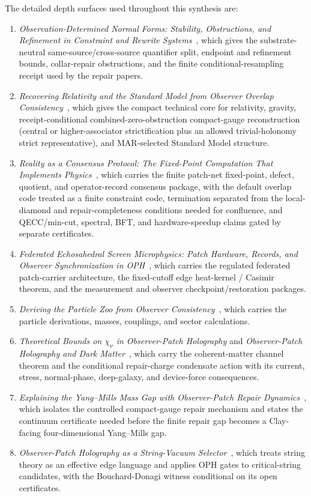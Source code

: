\documentclass[11pt]{article}
\begin{document}
The detailed depth surfaces used throughout this synthesis are:
\begin{enumerate}[leftmargin=2em]
\item \emph{Observation-Determined Normal Forms: Stability, Obstructions, and Refinement in Constraint and Rewrite Systems}~\cite{observableNormalForms}, which gives the substrate-neutral same-source/cross-source quantifier split, endpoint and refinement bounds, collar-repair obstructions, and the finite conditional-resampling receipt used by the repair papers.
\item \emph{Recovering Relativity and the Standard Model from Observer Overlap Consistency}~\cite{ophcompact}, which gives the compact technical core for relativity, gravity, receipt-conditional combined-zero-obstruction compact-gauge reconstruction (central or higher-associator strictification plus an allowed trivial-holonomy strict representative), and MAR-selected Standard Model structure.
\item \emph{Reality as a Consensus Protocol: The Fixed-Point Computation That Implements Physics}~\cite{ophconsensus}, which carries the finite patch-net fixed-point, defect, quotient, and operator-record consensus package, with the default overlap code treated as a finite constraint code, termination separated from the local-diamond and repair-completeness conditions needed for confluence, and QECC/min-cut, spectral, BFT, and hardware-speedup claims gated by separate certificates.
\item \emph{Federated Echosahedral Screen Microphysics: Patch Hardware, Records, and Observer Synchronization in OPH}~\cite{ophmicrophysics}, which carries the regulated federated patch-carrier architecture, the fixed-cutoff edge heat-kernel / Casimir theorem, and the measurement and observer checkpoint/restoration packages.
\item \emph{Deriving the Particle Zoo from Observer Consistency}~\cite{ophparticles}, which carries the particle derivations, masses, couplings, and sector calculations.
\item \emph{Theoretical Bounds on \(\chi_\nu\) in Observer-Patch Holography} and \emph{Observer-Patch Holography and Dark Matter}~\cite{ophchinu,ophdarkmatter}, which carry the coherent-matter channel theorem and the conditional repair-charge condensate action with its current, stress, normal-phase, deep-galaxy, and device-force consequences.
\item \emph{Explaining the Yang--Mills Mass Gap with Observer-Patch Repair Dynamics}~\cite{ophyangmills}, which isolates the controlled compact-gauge repair mechanism and states the continuum certificate needed before the finite repair gap becomes a Clay-facing four-dimensional Yang--Mills gap.
\item \emph{Observer-Patch Holography as a String-Vacuum Selector}~\cite{ophstringselector}, which treats string theory as an effective edge language and applies OPH gates to critical-string candidates, with the Bouchard-Donagi witness conditional on its open certificates.
\end{enumerate}
\end{document}
